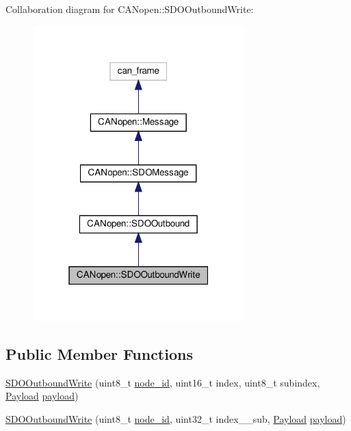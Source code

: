 Collaboration diagram for C\+A\+Nopen\+:\+:S\+D\+O\+Outbound\+Write\+:\nopagebreak
\begin{figure}[H]
\begin{center}
\leavevmode
\includegraphics[width=232pt]{class_c_a_nopen_1_1_s_d_o_outbound_write__coll__graph}
\end{center}
\end{figure}
\subsection*{Public Member Functions}
\begin{DoxyCompactItemize}
\item 
\hyperlink{class_c_a_nopen_1_1_s_d_o_outbound_write_af86ced7cb745cc3b18c4cd7c1406a312}{S\+D\+O\+Outbound\+Write} (uint8\+\_\+t \hyperlink{class_c_a_nopen_1_1_message_a845fe0c7682bd6eeef0a5dd87b5e3c63}{node\+\_\+id}, uint16\+\_\+t index, uint8\+\_\+t subindex, \hyperlink{class_c_a_nopen_1_1_payload}{Payload} \hyperlink{class_c_a_nopen_1_1_s_d_o_message_a051509ddb3a59dfe066f9d90c80c2eec}{payload})
\item 
\hyperlink{class_c_a_nopen_1_1_s_d_o_outbound_write_a7c71af3977530091cafdc6aeae6f6c6a}{S\+D\+O\+Outbound\+Write} (uint8\+\_\+t \hyperlink{class_c_a_nopen_1_1_message_a845fe0c7682bd6eeef0a5dd87b5e3c63}{node\+\_\+id}, uint32\+\_\+t index\+\_\+\+\_\+sub, \hyperlink{class_c_a_nopen_1_1_payload}{Payload} \hyperlink{class_c_a_nopen_1_1_s_d_o_message_a051509ddb3a59dfe066f9d90c80c2eec}{payload})
\end{DoxyCompactItemize}
